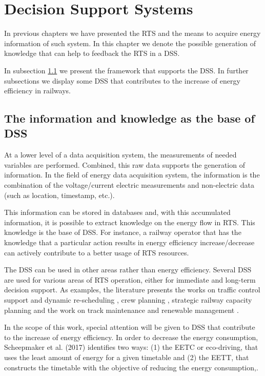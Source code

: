 


\section{Decision Support Systems}
In previous chapters we have presented the \ac{RTS} and the means to acquire energy information of such system.
In this chapter we denote the possible generation of knowledge that can help to feedback the \ac{RTS} in a  \ac{DSS}.

In subsection \ref{subs:351} we present the framework that supports the \ac{DSS}. In further subsections we display some \ac{DSS} that contributes to the increase of energy efficiency in railways.


\subsection{The information and knowledge as the base of \ac{DSS}}
\label{subs:351}

	At a lower level of a data acquisition system, the measurements of needed variables are performed. 
	Combined, this raw data supports the generation of information.
	In the field of energy data acquisition system, the information is the combination of the voltage/current electric measurements and non-electric data (such as location, timestamp, etc.).
	
	This information can be stored in databases and, with this accumulated information, it is possible to extract knowledge on the energy flow in \ac{RTS}.
	This knowledge is the base of \ac{DSS}. For instance, a railway operator that has the knowledge that a particular action results in energy efficiency increase/decrease can actively contribute to a better usage of \ac{RTS} resources.
	
	The \ac{DSS} can be used in other areas rather than energy efficiency. 	
	Several DSS are used for various areas of \ac{RTS} operation, either for immediate and long-term decision support.
	As examples, the literature presents the works on traffic control support and dynamic re-scheduling \cite{dariano2009, krasemann2012}, crew planning \cite{freling2004}, strategic railway capacity planning \cite{lai2011} and the work on track maintenance and renewable management \cite{guler2013}.
	
	
	In the scope of this work, special attention will be given to \ac{DSS} that contribute to the increase of energy efficiency. In order to decrease the energy consumption, Scheepmaker et al. (2017) identifies two ways: (1) the \ac{EETC} or eco-driving, that uses the least amount of energy for a given timetable and (2) the \ac{EETT}, that constructs the timetable with the objective of reducing the energy consumption,\cite{scheepmaker2017}.
	
